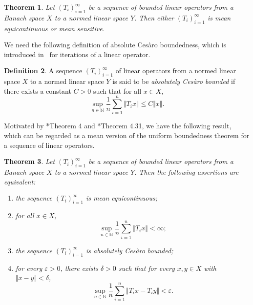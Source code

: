 \documentclass[12pt,a4paper]{amsart}
\theoremstyle{definition}
\newtheorem{defn}{Definition}[section]
\theoremstyle{plain}
\newtheorem{thm}[defn]{Theorem}
\begin{document}
\begin{thm}\label{thm:dich-mean-eq-mean-sen}
    Let $(T_i)_{i=1}^{\infty}$ be a sequence of bounded linear operators from a Banach space $X$ to a normed linear space $Y$. 
    Then either $(T_i)_{i=1}^{\infty}$ is mean equicontinuous or mean sensitive.
\end{thm}

We need the following definition of absolute Ces\`aro boundedness, which is introduced in~\cite{LH2015} for iterations of a linear operator.

\begin{defn}
    A sequence  $(T_i)_{i=1}^{\infty}$ of linear operators from a normed linear space $X$ to a normed linear space $Y$ is said to be \emph{absolutely Ces\`aro bounded} if there exists a constant $C>0$ such that for all $x\in X$,
    \[
        \sup_{n\in\mathbb{N}}\frac{1}{n}\sum_{i=1}^{n}\Vert T_i x\Vert\leq C\Vert x\Vert.
    \]
\end{defn}

Motivated by \cite{BBP2020}*{Theorem 4} and \cite{JL2022}*{Theorem 4.31}, we have the following result, which can be regarded as a mean
version of the uniform boundedness theorem for a sequence of linear operators.

\begin{thm}\label{thm:mean-UBT}
    Let $(T_i)_{i=1}^{\infty}$ be a sequence of bounded linear operators from a Banach space $X$ to a normed linear space $Y$.
    Then the following assertions are equivalent:
    \begin{enumerate}
        \item \label{thm1: ME}
              the sequence $(T_i)_{i=1}^{\infty}$  is mean equicontinuous;
        \item \label{thm2: x bounded}
             for all $x\in X$,
              \[
                  \sup_{n\in\mathbb{N}}\frac{1}{n}\sum_{i=1}^{n}\Vert T_i x\Vert<\infty;
              \]
        \item \label{thm3: aCb}
             the sequence $(T_i)_{i=1}^{\infty}$ is absolutely Ces\`aro bounded;
        \item \label{thm4: ME-sup}
             for every $\varepsilon>0$, there exists $\delta>0$ such that for every $x,y\in X$ with $\Vert x-y\Vert<\delta$,
              \[
                  \sup_{n\in\mathbb{N}}\frac{1}{n}\sum_{i=1}^{n}\Vert T_ix-T_iy\Vert<\varepsilon.
              \]

    \end{enumerate}
\end{thm}
\end{document}
